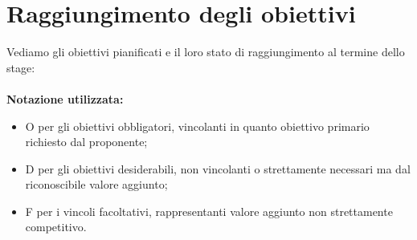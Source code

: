 \section{Raggiungimento degli obiettivi}
Vediamo gli obiettivi pianificati e il loro stato di raggiungimento al termine dello stage: 
\\\\
\textbf{Notazione utilizzata:}
\\
\begin{itemize}
    \item O per gli obiettivi obbligatori, vincolanti in quanto obiettivo primario richiesto dal proponente;
    \item D per gli obiettivi desiderabili, non vincolanti o strettamente necessari ma dal riconoscibile valore aggiunto;
    \item F per i vincoli facoltativi, rappresentanti valore aggiunto non strettamente competitivo.
\end{itemize}
\leavevmode\newline

